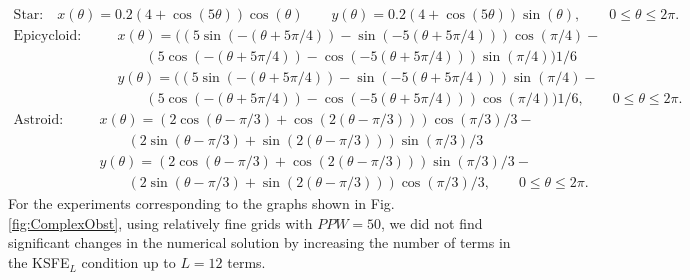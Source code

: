 \documentclass[final,3p,times,12pt]{elsarticle}
\begin{document}
\begin{eqnarray}
\mbox{Star:}\quad x(\theta)=
0.2(4+\cos(5\theta))\cos(\theta)\qquad
y(\theta)=0.2(4+\cos(5\theta))\sin(\theta),\qquad 0\leq \theta\leq
2\pi. \label{star}
\end{eqnarray}
\begin{eqnarray}
\label{epicycloid}
\mbox{Epicycloid:}\quad& &x(\theta)= ((5\sin(-(\theta+5\pi/4))-
     \sin(-5(\theta+5\pi/4)))\cos(\pi/4)-\nonumber\\\nonumber
     & &\qquad (5\cos(-(\theta+5\pi/4))-
     \cos(-5(\theta+5\pi/4)))\sin(\pi/4))1/6\\
& &y(\theta)= ((5\sin(-(\theta+5\pi/4))-
     \sin(-5(\theta+5\pi/4)))\sin(\pi/4)-\\\nonumber
     & & \qquad(5\cos(-(\theta+5\pi/4))-
     \cos(-5(\theta+5\pi/4)))\cos(\pi/4))1/6,\nonumber
     \qquad 0\leq \theta\leq 2\pi. 
\end{eqnarray}
\begin{eqnarray}
\mbox{Astroid:}\quad& &x(\theta)= \left(2\cos(\theta-\pi/3)+
     \cos(2(\theta-\pi/3))\right)\cos(\pi/3)/3-\nonumber\\
     & &\qquad\left(2\sin(\theta-\pi/3)+
     \sin(2(\theta-\pi/3))\right)\sin(\pi/3)/3\\
& &y(\theta)= \left(2\cos(\theta-\pi/3)+
     \cos(2(\theta-\pi/3))\right)\sin(\pi/3)/3-\nonumber\\\nonumber
     & &\qquad\left(2\sin(\theta-\pi/3)+
     \sin(2(\theta-\pi/3))\right)\cos(\pi/3)/3,
     \qquad 0\leq \theta\leq 2\pi. \label{astroid}
\end{eqnarray}
For the experiments corresponding to the graphs shown in Fig. \ref{fig:ComplexObst}, 
using  relatively fine grids with $PPW=50$, we did not find significant changes in the numerical solution by increasing the number of terms in the KSFE$_L$ condition up to $L=12$ terms. 
\end{document}
